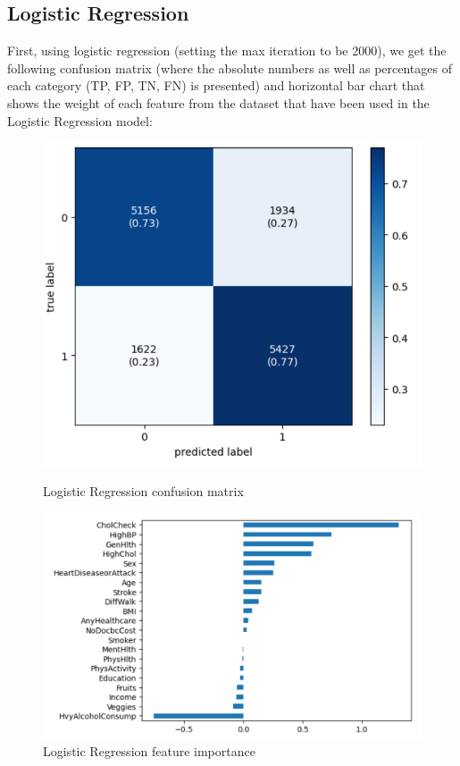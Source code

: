 \documentclass[12pt]{article}
\begin{document}
\subsection{Logistic Regression}
First, using  logistic regression (setting the max iteration to be 2000), we get the following confusion matrix (where the absolute numbers as well as percentages of each category (TP, FP, TN, FN) is presented) and horizontal bar chart that shows the weight of each feature from the dataset that have been used in the Logistic Regression model:
\begin{figure}[H]
  \centering
  \begin{minipage}[b]{0.45\textwidth}
    \centering
    \includegraphics[width=0.7\linewidth]{logreg_cm.png}
    \caption{Logistic Regression confusion matrix}
  \end{minipage}\hfill
  \begin{minipage}[b]{0.45\textwidth}
    \centering
    \includegraphics[width=0.7\linewidth]{logreg_w.png}
    \caption{Logistic Regression feature importance}
  \end{minipage}
\end{figure}
\end{document}
